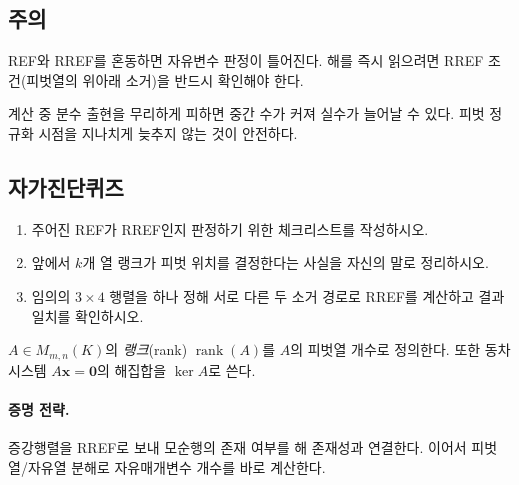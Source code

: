 \subsection*{주의}
\begin{warning}
REF와 RREF를 혼동하면 자유변수 판정이 틀어진다. 해를 즉시 읽으려면 RREF 조건(피벗열의 위아래 소거)을 반드시 확인해야 한다.
\end{warning}
\begin{warning}
계산 중 분수 출현을 무리하게 피하면 중간 수가 커져 실수가 늘어날 수 있다. 피벗 정규화 시점을 지나치게 늦추지 않는 것이 안전하다.
\end{warning}

\subsection*{자가진단퀴즈}
\begin{enumerate}[label=\arabic*.]
\item 주어진 REF가 RREF인지 판정하기 위한 체크리스트를 작성하시오.
\item 앞에서 $k$개 열 랭크가 피벗 위치를 결정한다는 사실을 자신의 말로 정리하시오.
\item 임의의 $3\times 4$ 행렬을 하나 정해 서로 다른 두 소거 경로로 RREF를 계산하고 결과 일치를 확인하시오.
\end{enumerate}


\begin{definition}
$A\in M_{m,n}(K)$의 \emph{랭크}(rank) $\operatorname{rank}(A)$를 $A$의 피벗열 개수로 정의한다. 또한 동차시스템 $A\mathbf{x}=\mathbf{0}$의 해집합을 $\ker A$로 쓴다.
\end{definition}

\paragraph{증명 전략.}
증강행렬을 RREF로 보내 모순행의 존재 여부를 해 존재성과 연결한다. 이어서 피벗열/자유열 분해로 자유매개변수 개수를 바로 계산한다.

